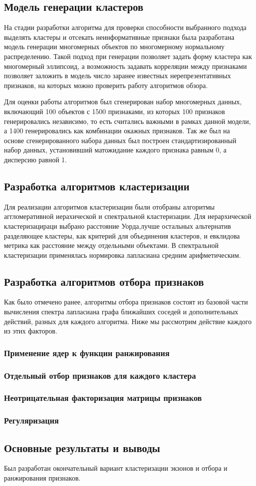 \subsection{Модель генерации кластеров}
На стадии разработки алгоритма для проверки способности выбранного подхода выделять кластеры и отсекать неинформативные признаки была разработана модель генерации многомерных объектов по многомерному нормальному распределению. Такой подход при генерации позволяет задать форму кластера как многомерный эллипсоид, а возможность задавать корреляции между признаками позволяет заложить в модель число заранее известных нерепрезентативных признаков, на которых можно проверить работу алгоритмов обзора.

Для оценки работы алгоритмов был сгенерирован набор многомерных данных, включающий 100 объектов с 1500 признаками, из которых 100 признаков генерировались независимо, то есть считались важными в рамках данной модели, а 1400 генерировались как комбинации окажных признаков. Так же был на основе сгенерированного набора данных был построен стандартизированный набор данных, установивший матожидание каждого признака равным 0, а дисперсию равной 1.

\subsection{Разработка алгоритмов кластеризации}
Для реализации алгоритмов кластеризации были отобраны алгоритмы аггломеративной иерахической и спектральной кластеризации. Для иерархической кластеризацираци выбрано расстояние Уорда,лучше остальных альтернатив разделяющее кластеры, как критерий для объединения кластеров, и евклидова метрика как расстояние между отдельными объектами. В спектральной кластеризации применялась нормировка лапласиана средним арифметическим.

\subsection{Разработка алгоритмов отбора признаков}
Как было отмечено ранее, алгоритмы отбора признаков состоят из базовой части вычисления спектра лапласиана графа ближайших соседей и дополнительных действий, разных для каждого алгоритма. Ниже мы рассмотрим действие каждого из этих факторов. 
\subsubsection{Применение ядер к функции ранжирования}
\subsubsection{Отдельный отбор признаков для каждого кластера}
\subsubsection{Неотрицательная факторизация матрицы признаков}
\subsubsection{Регуляризация}
\subsection{Основные результаты и выводы}
Был разработан окончательный вариант кластеризации экзонов и отбора и ранжирования признаков. 